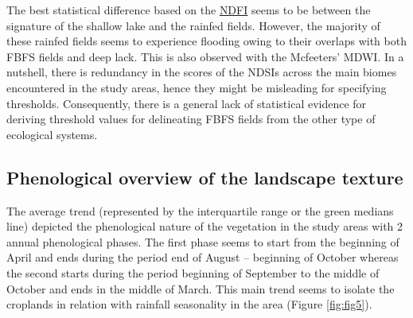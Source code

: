 \documentclass[12pt,oneside]{article}
\begin{document}
The best statistical difference based on the \href{http://journals.plos.org/plosone/article/file?id=10.1371/journal.pone.0088741\&type=printable}{NDFI} seems to be between the signature of the shallow lake and the rainfed fields. However, the majority of these rainfed fields seems to experience flooding owing to their overlaps with both FBFS fields and deep lack. This is also observed with the Mcfeeters' MDWI. In a nutshell, there is redundancy in the scores of the NDSIs across the main biomes encountered in the study areas, hence they might be misleading for specifying thresholds. Consequently, there is a general lack of statistical evidence for deriving threshold values for delineating FBFS fields from the other type of ecological systems.

\hypertarget{II2}{%
\subsection{Phenological overview of the landscape texture}\label{II2}}

The average trend (represented by the interquartile range or the green medians line) depicted the phenological nature of the vegetation in the study areas with 2 annual phenological phases. The first phase seems to start from the beginning of April and ends during the period end of August -- beginning of October whereas the second starts during the period beginning of September to the middle of October and ends in the middle of March. This main trend seems to isolate the croplands in relation with rainfall seasonality in the area (Figure \ref{fig:fig5}).
\end{document}
